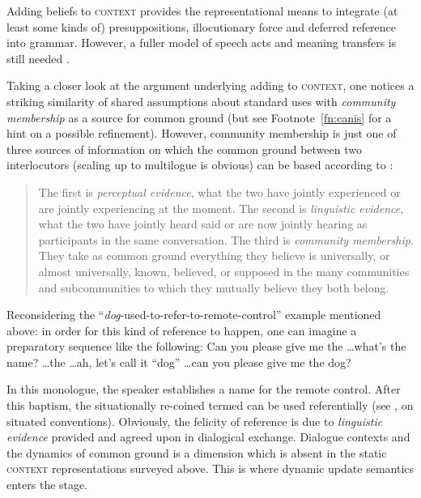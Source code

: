 \documentclass[output=paper]{langsci/langscibook}
\begin{document}
Adding beliefs to \textsc{context} provides the representational means to integrate (at least some kinds of) presuppositions, illocutionary force and deferred reference \citet{Nunberg:1978} into grammar.
%
However, a fuller model of speech acts and meaning transfers is still needed \citep[p.~94]{Kathol:Przepiorkowski:Tseng:2011}. %


Taking a closer look at the argument underlying adding  to \textsc{context}, one notices a striking similarity of shared assumptions about standard uses with \emph{community membership}  as a source for common ground (but see Footnote~\ref{fn:canis} for a hint on a possible refinement).
%
However, community membership is just one of three sources of information on which the common ground between two interlocutors (scaling up to multilogue is obvious) can be based according to \citet{Clark:Marshall:1981,Clark:Schreuder:Buttrick:1983}:
%
\begin{quote}
The first is \emph{perceptual evidence}, what the two have jointly experienced or are jointly experiencing at the moment. The second is \emph{linguistic evidence}, what the two have jointly heard said or are now jointly hearing as participants in the same conversation. The third is \emph{community membership}. They take as common ground everything they believe is universally, or almost universally, known, believed, or supposed in the many communities and subcommunities to which they mutually believe they both belong. \hfill \citep[p.~247]{Clark:Schreuder:Buttrick:1983} 
\end{quote}


Reconsidering the \enquote{\textit{dog}-used-to-refer-to-remote-control} example mentioned above: in order for this kind of reference to happen, one can imagine a preparatory sequence like the following:
%
\ea
Can you please give me the \ldots what's the name? \ldots the \ldots ah, let's call it \enquote{dog} \ldots can you please give me the dog?
\z

In this monologue, the speaker establishes a name for the remote control.
%
After this baptism, the situationally re-coined termed can be used referentially (see \citet{Luecking:Rieser:Staudacher:2006:b}, on situated conventions).
%
Obviously, the felicity of reference is due to \emph{linguistic evidence}  provided and agreed upon in dialogical exchange.
%
Dialogue contexts and the dynamics of common ground is a dimension which is absent in the static \textsc{context} representations surveyed above.
%
This is where dynamic update semantics enters the stage.
\end{document}
